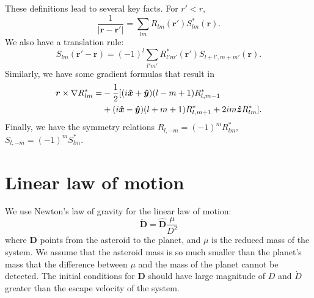 \documentclass[aps,twocolumn,secnumarabic,balancelastpage,amsmath,amssymb,nofootinbib,floatfix]{revtex4-1}
\begin{document}
These definitions lead to several key facts. For $r' < r$,
\begin{equation}
\frac{1}{|\bm r - \bm r'|}=\sum_{lm}R_{lm}(\bm r')S^*_{lm}(\bm r).
\label{eqn:expansion}
\end{equation}
We also have a translation rule:
\begin{equation}
S_{lm}(\bm r' - \bm r)=(-1)^l\sum_{l'm'}R^*_{l'm'}(\bm r')S_{l+l',m+m'}(\bm r)
\label{eqn:trans}.
\end{equation}
Similarly, we have some gradient formulas that result in
\begin{equation}
\begin{aligned}
\bm r \times \nabla R_{lm}^*=&-\frac{1}{2}[(i\bm{\hat x} + \bm{\hat y})(l-m+1)R^*_{l,m-1}\\
&+(i\bm{\hat x}-\bm{\hat y})(l+m+1)R^*_{l,m+1}+2im\bm{\hat z} R^*_{lm}].
\end{aligned}
\label{eqn:grad}
\end{equation}
Finally, we have the symmetry relations $R_{l,-m}=(-1)^mR_{lm}^*$, $S_{l,-m}=(-1)^mS_{lm}^*$.


\section{Linear law of motion}
We use Newton's law of gravity for the linear law of motion:
\begin{equation}
\ddot{\bm D} = \hat {\bm D} \frac{\mu}{D^2}
\label{eqn:linear-eom}
\end{equation}
where $\bm D$ points from the asteroid to the planet, and $\mu$ is the reduced mass of the system. We assume that the asteroid mass is so much smaller than the planet's mass that the difference between $\mu$ and the mass of the planet cannot be detected. The initial conditions for $\bm D$ should have large magnitude of $D$ and $\dot D$ greater than the escape velocity of the system.
\end{document}
